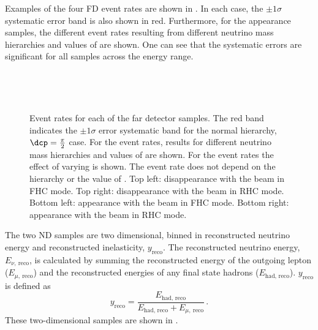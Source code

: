 Examples of the four FD event rates are shown in .
In each case, the $\pm1\sigma$ systematic error band is also shown in red.
Furthermore, for the appearance samples, the different event rates resulting from different neutrino mass hierarchies and values of \dcp are shown.
One can see that the systematic errors are significant for all samples across the energy range.

\begin{figure}
	\begin{minipage}[t]{.5\linewidth}
		\begin{adjustbox}{max totalsize=\linewidth, center}
			
		\end{adjustbox} \\
		\begin{adjustbox}{max totalsize=\linewidth, center}
			
		\end{adjustbox}
	\end{minipage}
	\hfill
	\begin{minipage}[t]{.5\linewidth}
		\begin{adjustbox}{max totalsize=\linewidth, center}
			
		\end{adjustbox} \\
		\begin{adjustbox}{max totalsize=\linewidth, center}
			
		\end{adjustbox}
	\end{minipage}
	\caption[DUNE far detector event rates with systematic error bands.]{Event rates for each of the far detector samples. The red band indicates the $\pm1\sigma$ error systematic band for the normal hierarchy, $\dcp = \frac{\pi}{2}$ case. For the \nue event rates, results for different neutrino mass hierarchies and values of \dcp are shown. For the \numu event rates the effect of varying  is shown. The \numu event rate does not depend on the hierarchy or the value of \dcp. Top left: \numu disappearance with the beam in FHC mode. Top right: \numu disappearance with the beam in RHC mode. Bottom left: \nue appearance with the beam in FHC mode. Bottom right: \nue appearance with the beam in RHC mode.}
	\label{fig:fdEventRatesWithErrorBand}
\end{figure}

The two ND samples are two dimensional, binned in reconstructed neutrino energy and reconstructed inelasticity, $y_{\text{reco}}$.
The reconstructed neutrino energy, $E_{\nu,~\text{reco}}$, is calculated by summing the reconstructed energy of the outgoing lepton ($E_{\mu,~\text{reco}}$) and the reconstructed energies of any final state hadrons ($E_{\text{had, reco}}$).
$y_{\text{reco}}$ is defined as
\begin{equation}
	y_{\text{reco}} = \frac{E_{\text{had, reco}}}{ E_{\text{had, reco}} + E_{\mu,~\text{reco}} } \, .
\end{equation}
These two-dimensional samples are shown in .

